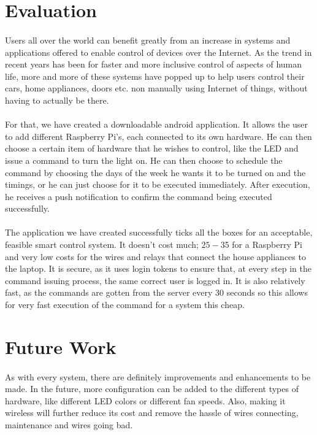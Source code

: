 \documentclass[12pt, oneside, a4paper]{book}
\begin{document}
		\section{Evaluation}
		\paragraph{} Users all over the world can benefit greatly from an increase in systems and applications offered to enable control of devices over the Internet. As the trend in recent years has been for faster and more inclusive control of aspects of human life, more and more of these systems have popped up to help users control their cars, home appliances, doors etc. non manually using Internet of things, without having to actually be there.
		\paragraph{} For that, we have created a downloadable android application. It allows the user to add different Raspberry Pi’s, each connected to its own hardware. He can then choose a certain item of hardware that he wishes to control, like the LED and issue a command to turn the light on. He can then choose to schedule the command by choosing the days of the week he wants it to be turned on and the timings, or he can just choose for it to be executed immediately. After execution, he receives a push notification to confirm the command being executed successfully.
		\paragraph{} The application we have created successfully ticks all the boxes for an acceptable, feasible smart control system. It doesn’t cost much; $25-$35 for a Raspberry Pi and very low costs for the wires and relays that connect the house appliances to the laptop. It is secure, as it uses login tokens to ensure that, at every step in the command issuing process, the same correct user is logged in. It is also relatively fast, as the commands are gotten from the server every 30 seconds so this allows for very fast execution of the command for a system this cheap.


		\section{Future Work}
		\paragraph{} As with every system, there are definitely improvements and enhancements to be made. In the future, more configuration can be added to the different types of hardware, like different LED colors or different fan speeds. Also, making it wireless will further reduce its cost and remove the hassle of wires connecting, maintenance and wires going bad. 
	\newpage
	
\end{document}

